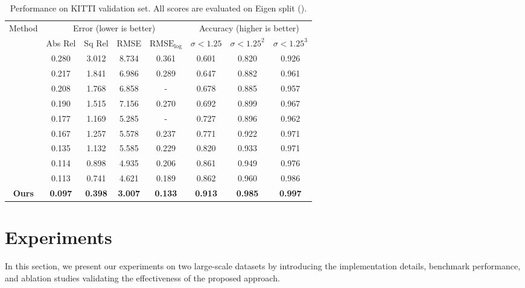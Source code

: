 \documentclass[letterpaper]{article} \usepackage{aaai20}  \usepackage{times}  \usepackage{helvet} \usepackage{courier}  \usepackage{graphicx} \frenchspacing  \setlength{\pdfpagewidth}{8.5in}  \setlength{\pdfpageheight}{11in}  \usepackage{epsfig}
\begin{document}
    \begin{table*}[t]
    \centering
    \vspace{-5pt}
    \caption{Performance on KITTI validation set. All scores are evaluated on Eigen split (\cite{Eigen2015Predicting}).}
    \label{tab:kitti}
    \small
    \setlength\tabcolsep{4pt}
    \begin{tabular}{|c|c|c|c|c|c|c|c|}
    \hline
    \multirow{2}{*}{Method} & \multicolumn{4}{c|}{Error (lower is better)} & \multicolumn{3}{c|}{Accuracy (higher is better)}\\
    & Abs Rel  & Sq Rel  & RMSE  & $\text{RMSE}_{\log}$   & $\sigma < 1.25$ & $\sigma < 1.25^2$ & $\sigma < 1.25^3$ \\ \hline
    \cite{Saxena2009Make3D}   & 0.280     & 3.012  & 8.734   & 0.361     & 0.601  & 0.820   & 0.926 \\ \hline
    \cite{Liu2016Learning}   & 0.217     & 1.841 & 6.986   & 0.289     & 0.647  & 0.882    & 0.961 \\ \hline 
    \cite{Zhou2017Unsupervised} & 0.208     & 1.768      & 6.858   & -  & 0.678   & 0.885 & 0.957    \\ \hline
    \cite{Eigen2014Depth}    & 0.190     & 1.515      & 7.156   & 0.270     & 0.692   & 0.899  & 0.967   \\ \hline
    \cite{Garg2016Unsupervised} & 0.177 &1.169 & 5.285 & - & 0.727& 0.896 & 0.962 \\ \hline
    \cite{Kundu2018AdaDepth}   & 0.167     & 1.257      & 5.578   & 0.237    & 0.771   & 0.922    & 0.971   \\ \hline
    \cite{Zhan2018Unsupervised} &0.135 &1.132& 5.585& 0.229& 0.820& 0.933& 0.971 \\ \hline
    \cite{Godard2017Unsupervised}   & 0.114     & 0.898      & 4.935   & 0.206     & 0.861   & 0.949   & 0.976  \\ \hline
    \cite{Kuznietsov2017Semi}   & 0.113     & 0.741      & 4.621   & 0.189     & 0.862  & 0.960  & 0.986  \\ \hline
    \textbf{Ours}    &\textbf{0.097}    & \textbf{0.398}     &\textbf{3.007}  & \textbf{0.133}   &\textbf{0.913} & \textbf{0.985}  & \textbf{0.997} \\ \hline
    \end{tabular}
    \vspace{-6pt}
    \end{table*}
    
    \section{Experiments}
    \label{sec:experiments}
    In this section, we present our experiments on two large-scale datasets by introducing the implementation details, benchmark performance, and ablation studies validating the effectiveness of the proposed approach.
 
\end{document}
